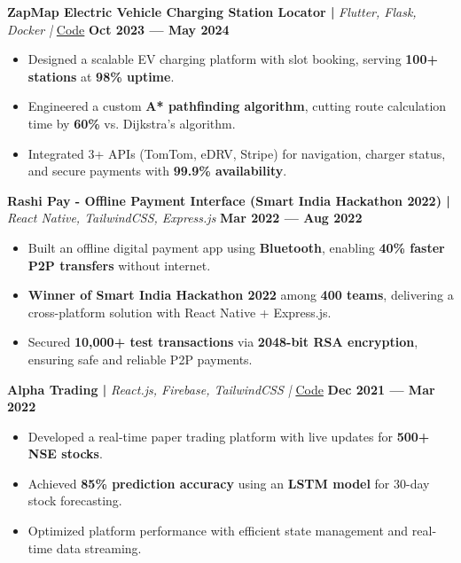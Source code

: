 \documentclass[a4,10pt]{article}
\newenvironment{zitemize}{
\begin{itemize}\itemsep0pt \parskip0pt \parsep1pt}
{\end{itemize}\vspace{-0.5cm}}
\begin{document}
\vspace{0.4cm}
\textbf{ZapMap Electric Vehicle Charging Station Locator | } \emph{Flutter, Flask, Docker | }{\href{https://github.com/Harsh-H-Shah/ZapMap}{\color{UI_blue} Code}}
\textbf{\hfill Oct 2023 --- May 2024}
\vspace{-0.2cm}
\begin{zitemize}
    \item Designed a scalable EV charging platform with slot booking, serving \textbf{100+ stations} at \textbf{98\% uptime}.  
    \item Engineered a custom \textbf{A* pathfinding algorithm}, cutting route calculation time by \textbf{60\%} vs. Dijkstra’s algorithm.  
    \item Integrated 3+ APIs (TomTom, eDRV, Stripe) for navigation, charger status, and secure payments with \textbf{99.9\% availability}.  
\end{zitemize}


\vspace{0.4cm}
\textbf{Rashi Pay - Offline Payment Interface (Smart India Hackathon 2022) | } \emph{React Native, TailwindCSS, Express.js}
\textbf{\hfill Mar 2022 --- Aug 2022}
\vspace{-0.2cm}
\begin{zitemize}
    \item Built an offline digital payment app using \textbf{Bluetooth}, enabling \textbf{40\% faster P2P transfers} without internet.  
    \item \textbf{Winner of Smart India Hackathon 2022} among \textbf{400 teams}, delivering a cross-platform solution with React Native + Express.js.  
    \item Secured \textbf{10,000+ test transactions} via \textbf{2048-bit RSA encryption}, ensuring safe and reliable P2P payments.  
\end{zitemize}
    
\vspace{0.4cm}
\textbf{Alpha Trading | } \emph{React.js, Firebase, TailwindCSS | }{\href{https://github.com/Harsh-H-Shah/Alpha-trading}{\color{UI_blue} Code}}
\textbf{\hfill Dec 2021 --- Mar 2022}
\vspace{-0.2cm}
\begin{zitemize}
    \item Developed a real-time paper trading platform with live updates for \textbf{500+ NSE stocks}.  
    \item Achieved \textbf{85\% prediction accuracy} using an \textbf{LSTM model} for 30-day stock forecasting.  
    \item Optimized platform performance with efficient state management and real-time data streaming.  
\end{zitemize}
\vspace{-0.2cm}
\end{document}
